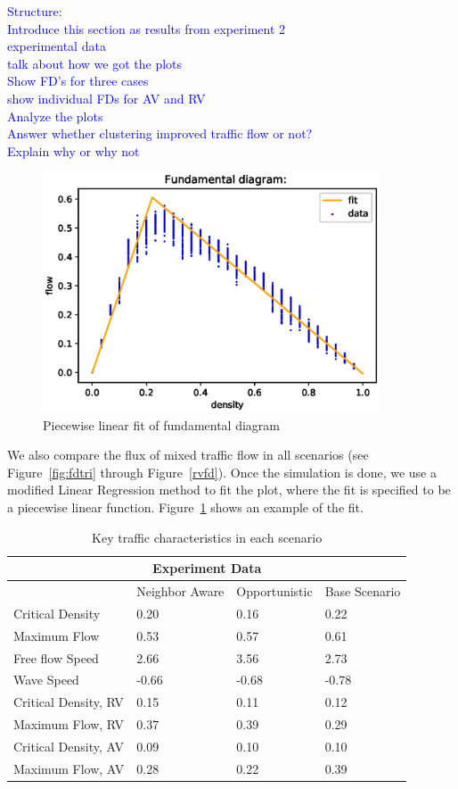 \documentclass[oneside,letter,11pt]{article}
\begin{document}
\textcolor{blue}{Structure: \\Introduce this section as results from experiment 2 \\experimental data  \\talk about how we got the plots \\Show FD's for three cases \\show individual FDs for AV and RV \\Analyze the plots \\Answer whether clustering improved traffic flow or not? \\Explain why or why not}
\begin{figure}[H]
\centering
  \includegraphics[width= 10cm]{fdfitr2m1.eps}
  \vspace{-0.6cm}
  \caption{Piecewise linear fit of fundamental diagram}
    \vspace{-0.2cm}
  \label{fig:fdtria1}
\end{figure}
We also compare the flux of mixed traffic flow in all scenarios (see Figure~\ref{fig:fdtri} through Figure~\ref{rvfd}). Once the simulation is done, we use a modified Linear Regression method to fit the plot, where the fit is specified to be a piecewise linear function. Figure~\ref{fig:fdtria1} shows an example of the fit.

\begin{table}[H]
\centering
\begin{tabular}{ |p{4cm}||p{3cm}|p{2.5cm}|p{2.5cm}|  }
 \hline
 \multicolumn{4}{|c|}{Experiment Data} \\
 \hline
  &Neighbor Aware  &Opportunistic &Base Scenario \\
 \hline
 Critical Density &   0.20  & 0.16   &0.22 \\
 Maximum Flow &0.53 & 0.57&  0.61 \\
  \hline
 Free flow Speed   & 2.66    &  3.56 &   2.73 \\
 Wave Speed    &-0.66 & -0.68 &  -0.78 \\
  \hline
 Critical Density, RV &   0.15  & 0.11   &0.12 \\
 Maximum Flow, RV &0.37 & 0.39&  0.29\\
  \hline
 Critical Density, AV &   0.09  & 0.10   &0.10 \\
 Maximum Flow, AV &0.28 & 0.22&  0.39 \\
 \hline
\end{tabular}
\caption{Key traffic characteristics in each scenario}
\label{table:sas}
\end{table}
\end{document}

